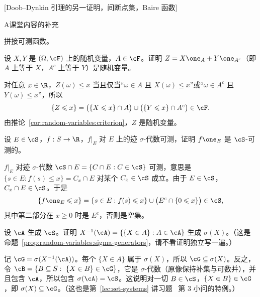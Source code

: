 [Doob–Dynkin 引理的另一证明，间断点集，Baire 函数]
\label{hw:random-variables}


\begin{exercises}{A}{课堂内容的补充}
\item\label{ex:random-variables:A1} 拼接可测函数。
\begin{questions}
\item 设 $X,Y$ 是 $(\Omega,\cF)$ 上的随机变量，$A\in\cF$。证明 $Z=X\one_A+Y\one_{A^c}$（即 $A$ 上等于 $X$，$A^c$ 上等于 $Y$）是随机变量。
\begin{solution}
对任意 $x\in\R$，$Z(\omega)\leqslant x$ 当且仅当“$\omega\in A$ 且 $X(\omega)\leqslant x$”或“$\omega\in A^c$ 且 $Y(\omega)\leqslant x$”，所以
\[
\{Z\leqslant x\}=\bigl(\{X\leqslant x\}\cap A\bigr)\cup\bigl(\{Y\leqslant x\}\cap A^c\bigr)\in\cF .
\]
由推论~\ref{cor:random-variables:criterion}，$Z$ 是随机变量。
\end{solution}
\item 设 $E\in\cS$，$f:S\to\R$，$f|_E$ 对 $E$ 上的迹 $\sigma$-代数可测，证明 $f\one_E$ 是 $\cS$-可测的。
\begin{solution}
$f|_E$ 对迹 $\sigma$-代数 $\cS\cap E=\{C\cap E:C\in\cS\}$ 可测，意思是 $\{s\in E:f(s)\leqslant x\}=C_x\cap E$ 对某个 $C_x\in\cS$ 成立。由于 $E\in\cS$，$C_x\cap E\in\cS$。于是
\[
\{f\one_E\leqslant x\}=\{s\in E:f(s)\leqslant x\}\cup\bigl(E^c\cap\{0\leqslant x\}\bigr)\in\cS,
\]
其中第二部分在 $x\geqslant0$ 时是 $E^c$，否则是空集。
\end{solution}
\end{questions}

\item\label{ex:random-variables:A2} 设 $\cA$ 生成 $\cS$。证明 $X^{-1}(\cA)=\{\{X\in A\}:A\in\cA\}$ 生成 $\sigma(X)$。（这是命题~\ref{prop:random-variables:sigma-generators}，请不看证明独立写一遍。）
\begin{solution}
记 $\cG=\sigma(X^{-1}(\cA))$。每个 $\{X\in A\}$ 属于 $\sigma(X)$，所以 $\cG\subseteq\sigma(X)$。反之，令 $\cB=\{B\subseteq S:\ \{X\in B\}\in\cG\}$，它是 $\sigma$-代数（原像保持补集与可数并），并且包含 $\cA$，所以包含 $\sigma(\cA)=\cS$。这说明对一切 $B\in\cS$，$\{X\in B\}\in\cG$，即 $\sigma(X)\subseteq\cG$。（这也是第~\ref{lec:set-systems} 讲习题~ 第 3 小问的特例。）
\end{solution}


\end{exercises}
